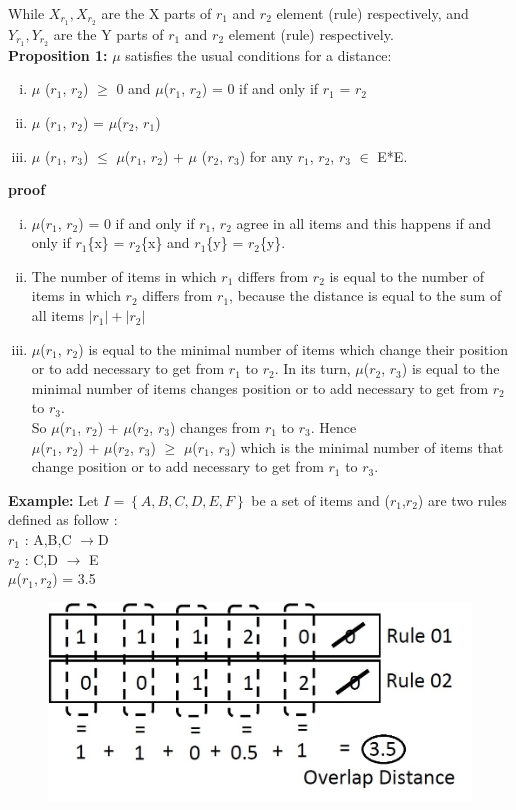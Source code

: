 \documentclass[preprint,12pt]{elsarticle}
\begin{document}
While $X_{r_1}, X_{r_2}$ are the X parts of $r_1$ and $r_2$ element (rule)
respectively, and $Y_{r_1}, Y_{r_2}$ are the Y parts of $r_1$ and $r_2$
element (rule) respectively. \\
\textbf{Proposition 1:} 
$\mu$   satisfies the usual conditions for a distance:
\begin{enumerate}[i)]
\item  $\mu$ ($r_1$, $r_2$) $\geq$ 0 and $\mu$($r_1$, $r_2$) = 0 if and only if $r_1$ = $r_2$
\item  $\mu$ ($r_1$, $r_2$) = $\mu$($r_2$, $r_1$)
\item  $\mu$ ($r_1$, $r_3$) $\leq$ $\mu$($r_1$, $r_2$) + $\mu$ ($r_2$, $r_3$) for any $r_1$, $r_2$, $r_3$ $\in$ E*E.
\end{enumerate}
\textbf{proof}
\begin{enumerate}[i)]
\item  $\mu$($r_1$, $r_2$) = 0 if and only if $r_1$, $r_2$ agree in all items and this happens if
and only if $r_1$\{x\} = $r_2$\{x\} and $r_1$\{y\} = $r_2$\{y\}.
\item  The number of items in which $r_1$ differs from $r_2$ is equal to the number of
items in which $r_2$ differs from $r_1$, because the distance is equal to the sum of all items $\left|r_1\right|+\left|r_2\right|$ 
\item  $\mu$($r_1$, $r_2$) is equal to the minimal number of items which change their position or to add necessary to get
from $r_1$ to $r_2$. In its turn, $\mu$($r_2$, $r_3$) is equal to the minimal number
of items changes position or to add
necessary to get from $r_2$ to $r_3$.\\
So $\mu$($r_1$, $r_2$) + $\mu$($r_2$, $r_3$) changes from $r_1$ to $r_3$. Hence \\
$\mu$($r_1$, $r_2$) + $\mu$($r_2$, $r_3$) $\geq$ $\mu$($r_1$, $r_3$) which is the minimal number of
items that change position or to add necessary to get from $r_1$ to $r_3$.
\end{enumerate}
\textbf{Example:}
Let $I=\left\{A,B,C,D,E,F\right\}$ be a set of items and ($r_{1}$,$r_{2}$) are two rules defined as follow :\\
$r_{1}$ : A,B,C $\rightarrow $D\\
$r_{2}$ : C,D $\rightarrow$ E \\
$\mu$($r_{1},r_{2}$) = 3.5
\begin{figure}[h]
\begin{center}
\includegraphics[scale=0.5]{3.jpg}
\end{center}
\label{Fig1}
\end{figure}
\end{document}
